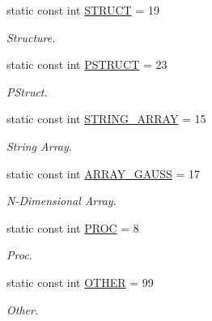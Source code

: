 \begin{DoxyCompactItemize}
\mbox{\label{struct_g_e_sym_type__s_a7abc9ab4e83c0b99f9fde37450489944}} 
static const int \hyperlink{struct_g_e_sym_type__s_a7abc9ab4e83c0b99f9fde37450489944}{S\+T\+R\+U\+CT} = 19
\begin{DoxyCompactList}\small\item\em Structure. \end{DoxyCompactList}\item 
\mbox{\label{struct_g_e_sym_type__s_a604a22cdce168927932ee303c2aa9c8c}} 
static const int \hyperlink{struct_g_e_sym_type__s_a604a22cdce168927932ee303c2aa9c8c}{P\+S\+T\+R\+U\+CT} = 23
\begin{DoxyCompactList}\small\item\em P\+Struct. \end{DoxyCompactList}\item 
\mbox{\label{struct_g_e_sym_type__s_a8b841bad6dacbbacf0d423219bd08a98}} 
static const int \hyperlink{struct_g_e_sym_type__s_a8b841bad6dacbbacf0d423219bd08a98}{S\+T\+R\+I\+N\+G\+\_\+\+A\+R\+R\+AY} = 15
\begin{DoxyCompactList}\small\item\em String Array. \end{DoxyCompactList}\item 
\mbox{\label{struct_g_e_sym_type__s_ae49660fdf27d7d165463abb2ccc941e4}} 
static const int \hyperlink{struct_g_e_sym_type__s_ae49660fdf27d7d165463abb2ccc941e4}{A\+R\+R\+A\+Y\+\_\+\+G\+A\+U\+SS} = 17
\begin{DoxyCompactList}\small\item\em N-\/\+Dimensional Array. \end{DoxyCompactList}\item 
\mbox{\label{struct_g_e_sym_type__s_a117901fdf3914c09101a90fe7867f111}} 
static const int \hyperlink{struct_g_e_sym_type__s_a117901fdf3914c09101a90fe7867f111}{P\+R\+OC} = 8
\begin{DoxyCompactList}\small\item\em Proc. \end{DoxyCompactList}\item 
\mbox{\label{struct_g_e_sym_type__s_ae27a11fce0f32a022df8925068b4257c}} 
static const int \hyperlink{struct_g_e_sym_type__s_ae27a11fce0f32a022df8925068b4257c}{O\+T\+H\+ER} = 99
\begin{DoxyCompactList}\small\item\em Other. \end{DoxyCompactList}\end{DoxyCompactItemize}


